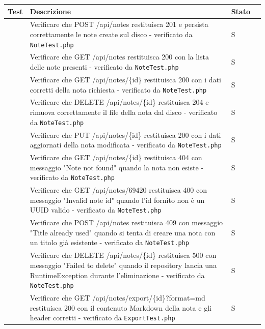 \documentclass[a4paper,10pt]{article}
\begin{document}

\newcommand{\testI}{%
    \stepcounter{TI@}%
    \noindent{TI-\arabic{TI@}}\quad\par
}

\begin{longtable}{|l|p{8cm}|p{2cm}|p{1.5cm}|}
    \hline
    \textbf{Test} & \textbf{Descrizione} & \textbf{Stato} \\ \hline
    \endfirsthead
    \testI & Verificare che POST /api/notes restituisca 201 e persista correttamente le note create sul disco - verificato da \texttt{NoteTest.php} & S \\ \hline
    \testI & Verificare che GET /api/notes restituisca 200 con la lista delle note presenti - verificato da \texttt{NoteTest.php} & S \\ \hline
    \testI & Verificare che GET /api/notes/\{id\} restituisca 200 con i dati corretti della nota richiesta - verificato da \texttt{NoteTest.php} & S \\ \hline
    \testI & Verificare che DELETE /api/notes/\{id\} restituisca 204 e rimuova correttamente il file della nota dal disco - verificato da \texttt{NoteTest.php} & S \\ \hline
    \testI & Verificare che PUT /api/notes/\{id\} restituisca 200 con i dati aggiornati della nota modificata - verificato da \texttt{NoteTest.php} & S \\ \hline
    \testI & Verificare che GET /api/notes/\{id\} restituisca 404 con messaggio "Note not found" quando la nota non esiste - verificato da \texttt{NoteTest.php} & S \\ \hline
    \testI & Verificare che GET /api/notes/69420 restituisca 400 con messaggio "Invalid note id" quando l'id fornito non è un UUID valido - verificato da \texttt{NoteTest.php} & S \\ \hline
    \testI & Verificare che POST /api/notes restituisca 409 con messaggio "Title already used" quando si tenta di creare una nota con un titolo già esistente - verificato da \texttt{NoteTest.php} & S \\ \hline
    \testI & Verificare che DELETE /api/notes/\{id\} restituisca 500 con messaggio "Failed to delete" quando il repository lancia una RuntimeException durante l'eliminazione - verificato da \texttt{NoteTest.php} & S \\ \hline
    \testI & Verificare che GET /api/notes/export/\{id\}?format=md restituisca 200 con il contenuto Markdown della nota e gli header corretti - verificato da \texttt{ExportTest.php} & S \\ \hline

\end{longtable}
\end{document}
